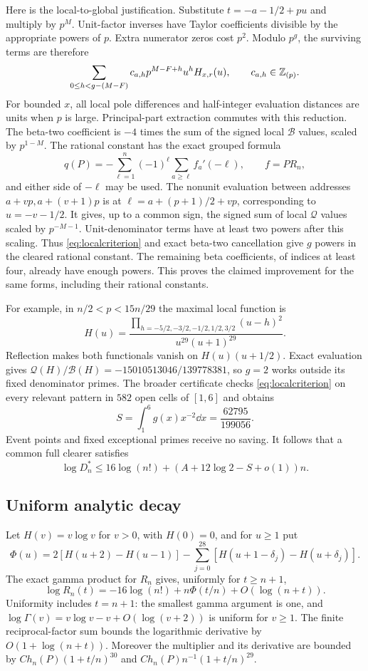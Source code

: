 Here is the local-to-global justification. Substitute
$t=-a-1/2+pu$ and multiply by $p^M$. Unit-factor inverses have
Taylor coefficients divisible by the appropriate powers of $p$.
Extra numerator zeros cost $p^2$. Modulo $p^g$, the surviving terms
are therefore
\[
 \sum_{0\leq h<g-(M-F)}c_{a,h}p^{M-F+h}u^hH_{x,r}(u),
 \qquad c_{a,h}\in\mathbb Z_{(p)}.
\]
For bounded $x$, all local pole differences and half-integer evaluation
distances are units when $p$ is large. Principal-part extraction
commutes with this reduction. The beta-two coefficient is $-4$ times
the sum of the signed local $\mathcal B$ values, scaled by $p^{1-M}$.
The rational constant has the exact grouped formula
\[
 q(P)=-\sum_{\ell=1}^n(-1)^\ell\sum_{a\geq\ell}f_a'(-\ell),
 \qquad f=PR_n,
\]
and either side of $-\ell$ may be used. The nonunit evaluation between
addresses $a+vp,a+(v+1)p$ is at
$\ell=a+(p+1)/2+vp$, corresponding to $u=-v-1/2$.
It gives, up to a common sign, the signed sum of local $\mathcal Q$
values scaled by $p^{-M-1}$. Unit-denominator terms have at least two
powers after this scaling. Thus \eqref{eq:localcriterion} and exact
beta-two cancellation give $g$ powers in the cleared rational constant.
The remaining beta coefficients, of indices at least four, already
have enough powers. This proves the claimed improvement for the same
forms, including their rational constants.

For example, in $n/2<p<15n/29$ the maximal local function is
\[
 H(u)=\frac{\prod_{h=-5/2,-3/2,-1/2,1/2,3/2}(u-h)^2}
                    {u^{29}(u+1)^{29}}.
\]
Reflection makes both functionals vanish on $H(u)(u+1/2)$.
Exact evaluation gives $\mathcal Q(H)/\mathcal B(H)
=-15010513046/139778381$, so $g=2$ works outside its fixed denominator
primes. The broader certificate checks \eqref{eq:localcriterion}
on every relevant pattern in $582$ open cells of $[1,6]$ and obtains
\begin{equation}\label{eq:savingS}
 S=\int_1^6g(x)x^{-2}\dd x=\frac{62795}{199056}.
\end{equation}
Event points and fixed exceptional primes receive no saving. It follows
that a common full clearer satisfies
\begin{equation}\label{eq:fullclearlinear}
 \log D_n^*\leq16\log(n!)+(A+12\log2-S+o(1))n.
\end{equation}

\subsection{Uniform analytic decay}
Let $H(v)=v\log v$ for $v>0$, with $H(0)=0$, and for $u\geq1$ put
\[
 \Phi(u)=2[H(u+2)-H(u-1)]
       -\sum_{j=0}^{28}[H(u+1-\delta_j)-H(u+\delta_j)].
\]
The exact gamma product for $R_n$ gives, uniformly for $t\geq n+1$,
\[
 \log R_n(t)=-16\log(n!)+n\Phi(t/n)+O(\log(n+t)).
\]
Uniformity includes $t=n+1$: the smallest gamma argument is one,
and $\log\Gamma(v)=v\log v-v+O(\log(v+2))$ is uniform for $v\geq1$.
The finite reciprocal-factor sum bounds the logarithmic derivative
by $O(1+\log(n+t))$. Moreover the multiplier and its derivative
are bounded by $C h_n(P)(1+t/n)^{30}$ and
$C h_n(P)n^{-1}(1+t/n)^{29}$.

